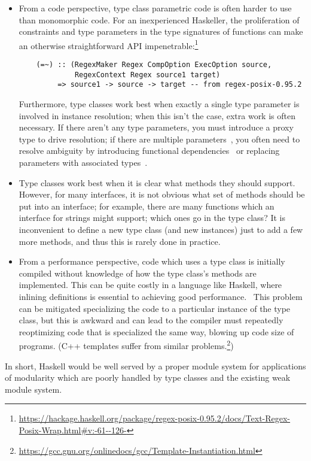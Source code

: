 \begin{itemize}
    \item From a code perspective, type class parametric code is often
    harder to use than monomorphic code.  For an inexperienced
    Haskeller, the proliferation of constraints and type parameters in the
    type signatures of functions can make an otherwise straightforward
    API impenetrable:\footnote{\url{https://hackage.haskell.org/package/regex-posix-0.95.2/docs/Text-Regex-Posix-Wrap.html#v:-61--126-}}
    \begin{lstlisting}
    (=~) :: (RegexMaker Regex CompOption ExecOption source,
             RegexContext Regex source1 target)
         => source1 -> source -> target -- from regex-posix-0.95.2
    \end{lstlisting}
    Furthermore, type classes work best when exactly a single type
    parameter is involved in instance resolution; when this isn't the
    case, extra work is often necessary. If there aren't any type
    parameters, you must introduce a proxy type to drive resolution; if
    there are multiple parameters~\cite{lfp92}, you often need to resolve ambiguity
    by introducing functional
    dependencies~\cite{Jones:2000:TCF:645394.651909} or replacing
    parameters with associated types~\cite{towards-open-type-functions-haskell}.

    \item Type classes work best when it is clear what methods they
    should support.  However, for many interfaces, it is not obvious
    what set of methods should be put into an interface; for example,
    there are many functions which an interface for strings might
    support; which ones go in the type class?  It is inconvenient
    to define a new type class (and new instances) just to add a
    few more methods, and thus this is rarely done in practice.

    \item From a performance perspective, code which uses a type class
    is initially compiled without knowledge of how the type class's
    methods are implemented.  This can be quite costly in a language
    like Haskell, where inlining definitions is essential to achieving
    good performance.~\cite{PeytonJones:2002:SGH:968417.968422}  This problem can be mitigated specializing
    the code to a particular instance of the type class, but this
    is awkward and can lead to the compiler must repeatedly reoptimizing
    code that is specialized the same way, blowing up code size of
    programs. (C++ templates suffer from similar problems.\footnote{\url{https://gcc.gnu.org/onlinedocs/gcc/Template-Instantiation.html}})
\end{itemize}
%
In short, Haskell would be well served by a proper module system for
applications of modularity which are poorly handled by type
classes and the existing weak module system.

